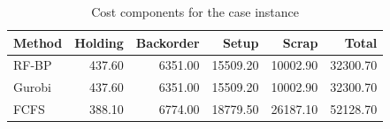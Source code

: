 \begin{table}[htbp]
\centering\small
\caption{Cost components for the case instance}
\begin{tabular}{lrrrrr}
\toprule
Method & Holding & Backorder & Setup & Scrap & Total \\
\midrule
RF-BP & 437.60 & 6351.00 & 15509.20 & 10002.90 & 32300.70 \\
Gurobi & 437.60 & 6351.00 & 15509.20 & 10002.90 & 32300.70 \\
FCFS & 388.10 & 6774.00 & 18779.50 & 26187.10 & 52128.70 \\
\bottomrule
\end{tabular}
\end{table}
